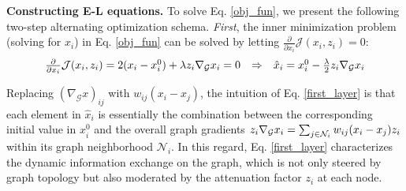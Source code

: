 \documentclass{article}
\begin{document}
\textbf{Constructing E-L equations.} To solve Eq. \ref{obj_fun}, we present the following two-step alternating optimization schema. \textit{First}, the inner minimization problem (solving for  $x_i$) in Eq. \ref{obj_fun} can be solved by letting $\frac{\partial }{{\partial x_i}}\mathcal{J}(x_i,z_i)=0$:
 \begin{equation}
 \label{first_layer}
\begin{array}{*{20}{c}}
{\frac{\partial }{{\partial x_i}}{\cal J}(x_i,z_i) = 2(x_i - {x_i^0}) + \lambda z_i {\nabla _{\cal G}}x_i = 0}& \Rightarrow &{\hat x_i = {x_i^0} - \frac{\lambda }{2}z_i\nabla _{\cal G}x_{i}}
\end{array}
\end{equation}


Replacing $\left(\nabla_{\mathcal{G}} x\right)_{i j}$ with $w_{i j}\left(x_i-x_j\right)$, the intuition of Eq. \ref{first_layer} is that each element in $\hat{x}_i$ is essentially the combination between the corresponding initial value in $x^0_i$ and the overall graph gradients $z_i\nabla _{\cal G}x_{i}=\sum_{j\in \mathcal{N}_i}w_{ij}(x_i-x_j)z_i$ within its graph neighborhood $\mathcal{N}_i$. In this regard, Eq. \ref{first_layer} characterizes the dynamic information exchange on the graph, which is not only steered by graph topology but also moderated by the attenuation factor $z_i$ at each node.
\end{document}
